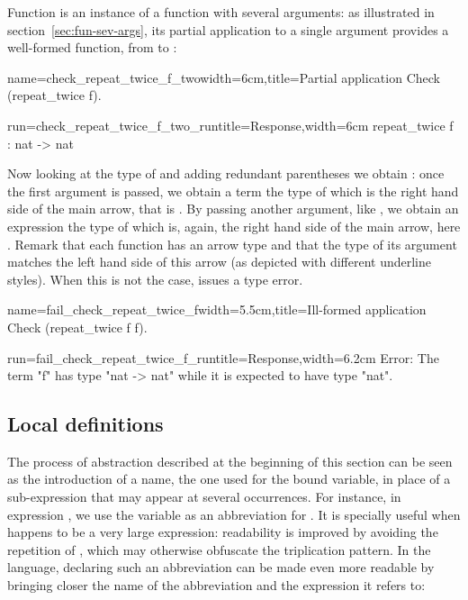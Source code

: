 Function   is an instance of a function with several
arguments: as illustrated in section~\ref{sec:fun-sev-args}, its
partial application to a single argument provides a well-formed
function, from  to :

\begin{coq}{name=check_repeat_twice_f_two}{width=6cm,title=Partial application}
Check (repeat_twice f).
\end{coq}
\begin{coqout}{run=check_repeat_twice_f_two_run}{title=Response,width=6cm}
repeat_twice f : nat -> nat
\end{coqout}

Now looking at the type of  and adding redundant parentheses
we obtain :
once the first argument
 is passed, we obtain a term the type of which is
the right hand side of the main arrow, that is .
By passing another argument, like , we obtain an expression
the type of which is, again, the right hand side of the main arrow,
here .
Remark that each function has an arrow type and that the type of its
argument matches the left hand side of this arrow (as depicted with
different underline styles). When this is not the case, \Coq{} issues a
type error.

\begin{coq}{name=fail_check_repeat_twice_f}{width=5.5cm,title=Ill-formed
  application}
Check (repeat_twice f f).
\end{coq}
\begin{coqout}{run=fail_check_repeat_twice_f_run}{title=Response,width=6.2cm}
Error: The term "f" has type "nat -> nat"
while it is expected to have type "nat".
\end{coqout}

\subsection{Local definitions}

The process of abstraction described at the beginning of this section
can be seen as the introduction of a name, the one used for the bound
variable, in place of a sub-expression that may appear at
several occurrences. For instance, in expression
, we use the variable  as an
abbreviation for . It is specially useful when  happens to
be a very large expression: readability is improved by avoiding the
repetition of , which may otherwise obfuscate the triplication
pattern. In the \Coq{}
language, declaring such an abbreviation can be made even more
readable by bringing closer the name of the abbreviation  and the
expression it refers to:

